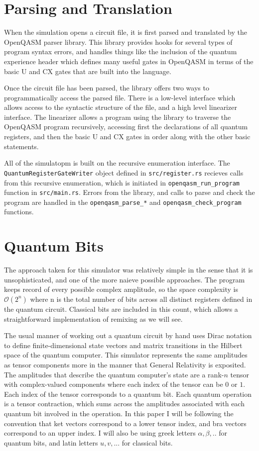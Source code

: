 \documentclass[%
 reprint,
 amsmath,amssymb,
 aps,
]{revtex4-2}
\begin{document}
\section{\label{sec:level1} Parsing and Translation}
When the simulation opens a circuit file, it is first parsed and translated by the OpenQASM parser library. This library provides hooks for several types of program syntax errors, and handles things like the inclusion of the quantum experience header which defines many useful gates in OpenQASM in terms of the basic U and CX gates that are built into the language. 

Once the circuit file has been parsed, the library offers two ways to programmatically access the parsed file. There is a low-level interface which allows access to the syntactic structure of the file, and a high level linearizer interface. The linearizer allows a program using the library to traverse the OpenQASM program recursively, accessing first the declarations of all quantum registers, and then the basic U and CX gates in order along with the other basic statements.

All of the simulatopm is built on the recursive enumeration interface. The \texttt{QuantumRegisterGateWriter} object defined in \texttt{src/register.rs} recieves calls from this recursive enumeration, which is initiated in \texttt{openqasm\_run\_program} function in \texttt{src/main.rs}. Errors from the library, and calls to parse and check the program are handled in the \texttt{openqasm\_parse\_*} and \texttt{openqasm\_check\_program} functions.

\section{\label{sec:level1} \label{qubits} Quantum Bits}
The approach taken for this simulator was relatively simple in the sense that it is unsophisticated, and one of the more naieve possible approaches. The program keeps record of every possible complex amplitude, so the space complexity is $\mathcal{O}(2^n)$ where n is the total number of bits across all distinct registers defined in the quantum circuit. Classical bits are included in this count, which allows a straightforward implementation of remixing as we will see.

The usual manner of working out a quantum circuit by hand uses Dirac notation to define finite-dimensional state vectors and matrix transitions in the Hilbert space of the quantum computer. This simulator represents the same amplitudes as tensor components more in the manner that General Relativity is exposited. The amplitudes that describe the quantum computer's state are a rank-$n$ tensor with complex-valued components where each index of the tensor can be $0$ or $1$\cite{kattemolleQuantum}. Each index of the tensor corresponds to a quantum bit. Each quantum operation is a tensor contraction, which sums across the amplitudes associated with each quantum bit involved in the operation. In this paper I will be following the convention that ket vectors correspond to a lower tensor index, and bra vectors correspond to an upper index. I will also be using greek letters $\alpha, \beta, ..$ for quantum bits, and latin letters $u, v,...$ for classical bits.
\end{document}
